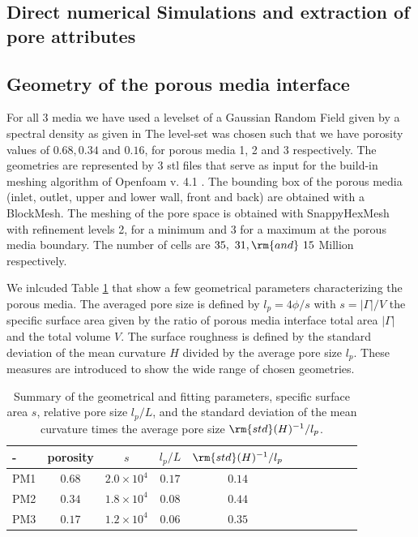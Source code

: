 \documentclass[draft,jgrga]{agutexSI2019}
\begin{document}
\begin{article}
\section{Direct numerical Simulations and extraction of pore attributes}

\subsection{Geometry of the porous media interface}
For all 3 media we have used a levelset of a Gaussian Random Field given by a spectral density as given in \cite{roberts_transport_1995} The level-set was chosen such that we have porosity values of $0.68,0.34$ and $0.16$, for porous media 1, 2 and 3 respectively. The geometries are represented by 3 stl files that serve as input for the build-in meshing algorithm of Openfoam v. 4.1 . The bounding box of the porous media (inlet, outlet, upper and lower wall, front and back) are obtained with a BlockMesh. The meshing of the pore space is obtained with SnappyHexMesh with refinement levels 2, for a minimum and 3 for a maximum at the porous media boundary. The number of cells are $35,~ 31,\rm{and}~15$ Million respectively.

We inlcuded Table \ref{tab:results_geometries} that show a few geometrical parameters characterizing the porous media. The averaged pore size is defined by $l_p = 4 \phi/s$ with $s= |\Gamma|/V$ the specific surface area given by the ratio of porous media interface total area $|\Gamma|$ and the total volume $V$. The surface roughness is defined by the standard deviation of the mean curvature $H$ divided by the average pore size $l_p$. These measures are introduced to show the wide range of chosen geometries. 

\begin{table}[htbp!]
\caption{Summary of the geometrical and fitting parameters, specific surface area $s$, relative pore size $l_p/L$, and the standard deviation of the mean curvature times the average pore size $\rm{std}(H)^{-1}/l_p$.}

\begin{tabular}{l|c|c|c|c|c|c|c|c|c|c}
- & porosity & $s$ & $ l_p/L$ &  $\rm{std}(H)^{-1}/l_p$ \\
\hline
PM1 &$0.68$ & $2.0\times10^{4}$ & $0.17$ &  $0.14$ \\
PM2 & $0.34$ & $1.8\times10^{4}$ & $0.08$ &  $0.44$ \\
PM3 & $0.17$ & $1.2\times10^{4}$ & $0.06$ &  $0.35$ 
\end{tabular}
\label{tab:results_geometries}
\end{table}



\end{article}
\end{document}
